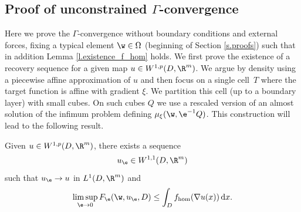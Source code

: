 \subsection{Proof of unconstrained \texorpdfstring{$\Gamma$}{}-convergence}
Here we prove the $\Gamma$-convergence without boundary conditions and external forces, fixing a typical element $\w\in\Omega$ (\cf beginning of Section \ref{s.proofs}) such that in addition Lemma \ref{l.existence_f_hom} holds. We first prove the existence of a recovery sequence for a given map $u\in W^{1,p}(D,\R^m)$. We argue by density using a piecewise affine approximation of $u$ and then focus on a single cell~$T$ where the target function is affine with gradient $\xi$. We partition this cell (up to a boundary layer) with small cubes. On such cubes $Q$ we use a rescaled version of an almost solution of the infimum problem defining $\mu_{\xi}(\w,\e^{-1}Q)$. This construction will lead to the following result.
\begin{proposition}\label{p.ub}
Given $u\in W^{1,p}(D,\R^m)$, there exists a sequence
\[
u_{\e}\in W^{1,1}(D,\R^m)
\]
such that $u_{\e}\to u$ in $L^1(D,\R^m)$ and
\begin{equation*}
\limsup_{\e\to 0}F_{\e}(\w,u_{\e},D)\leq \int_D f_{\hom}(\nabla u(x))\,\mathrm{d}x.
\end{equation*}
\end{proposition}
